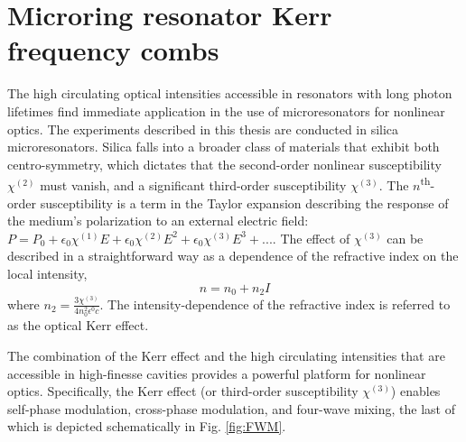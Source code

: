 







\section{Microring resonator Kerr frequency combs}

The high circulating optical intensities accessible in resonators with long photon lifetimes find immediate application in the use of microresonators for nonlinear optics. The experiments described in this thesis are conducted in silica microresonators. Silica falls into a broader class of materials that exhibit both centro-symmetry, which dictates that the second-order nonlinear susceptibility $\chi^{(2)}$ must vanish, and a significant third-order susceptibility $\chi^{(3)}$. The $n$\textsuperscript{th}-order susceptibility is a term in the Taylor expansion describing the response of the medium's polarization to an external electric field: $P=P_0+\epsilon_0 \chi^{(1)} E + \epsilon_0 \chi^{(2)} E^2 + \epsilon_0 \chi^{(3)} E^3+...$. The effect of $\chi^{(3)}$ can be described in a straightforward way as a dependence of the refractive index on the local intensity\cite{somethingelse},
\begin{equation}
n=n_0+n_2 I \label{eq:KerrIndex}
\end{equation}
where $n_2=\frac{3\chi^{(3)}}{4n_0^2\epsilon^0 c}$\cite{CosoAndSolis,alsoLLbook?}. The intensity-dependence of the refractive index is referred to as the optical Kerr effect.

The combination of the Kerr effect and the high circulating intensities that are accessible in high-finesse cavities provides a powerful platform for nonlinear optics. Specifically, the Kerr effect (or third-order susceptibility $\chi^{(3)}$) enables self-phase modulation, cross-phase modulation, and four-wave mixing, the last of which is depicted schematically in Fig. \ref{fig:FWM}. 

